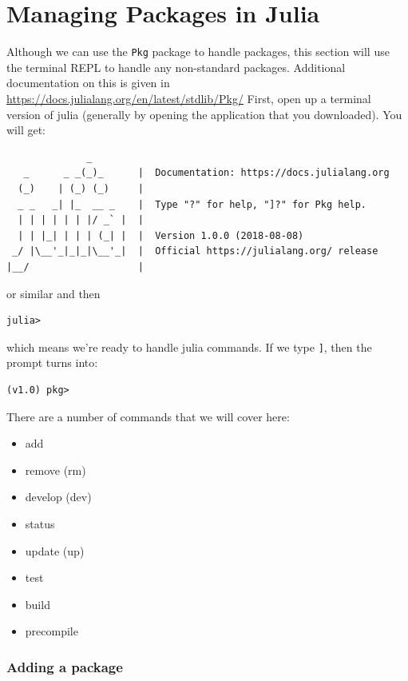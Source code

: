 
\chapter{Managing Packages in Julia}

Although we can use the \texttt{Pkg} package to handle packages, this
section will use the terminal REPL to handle any non-standard packages.
Additional documentation on this is given in
\href{Julia's\%20package\%20manager\%20help\%20pages}{https://docs.julialang.org/en/latest/stdlib/Pkg/}
First, open up a terminal version of julia (generally by opening the
application that you downloaded). You will get:

\begin{verbatim}
              _
   _      _ _(_)_      |  Documentation: https://docs.julialang.org
  (_)    | (_) (_)     |
  _ _   _| |_  __ _    |  Type "?" for help, "]?" for Pkg help.
  | | | | | | |/ _` |  |
  | | |_| | | | (_| |  |  Version 1.0.0 (2018-08-08)
 _/ |\__'_|_|_|\__'_|  |  Official https://julialang.org/ release
|__/                   |
\end{verbatim}

or similar and then

\begin{verbatim}
julia>
\end{verbatim}

which means we're ready to handle julia commands. If we type
\texttt{{]}}, then the prompt turns into:

\begin{verbatim}
(v1.0) pkg>
\end{verbatim}

There are a number of commands that we will cover here:

\begin{itemize}

\item
  add
\item
  remove (rm)
\item
  develop (dev)
\item
  status
\item
  update (up)
\item
  test
\item
  build
\item
  precompile
\end{itemize}

\subsection{Adding a package}

